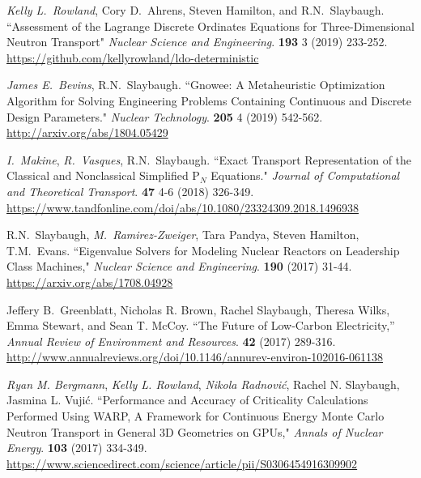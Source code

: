 \begin{bibsection}
\item \textit{Kelly L.\ Rowland}, Cory D.\ Ahrens, Steven Hamilton, and R.N.\ Slaybaugh. ``Assessment of the Lagrange Discrete Ordinates Equations for Three-Dimensional Neutron Transport"  \textit{Nuclear Science and Engineering}. \textbf{193} 3 (2019) 233-252.\\
\url{https://github.com/kellyrowland/ldo-deterministic}

\item \textit{James E.\ Bevins}, R.N.\ Slaybaugh. ``Gnowee: A Metaheuristic Optimization Algorithm for Solving Engineering Problems Containing Continuous and Discrete Design Parameters." \textit{Nuclear Technology}. \textbf{205} 4 (2019) 542-562.\\
\url{http://arxiv.org/abs/1804.05429}

\item \textit{I.\ Makine}, \textit{R.\ Vasques}, R.N.\ Slaybaugh. ``Exact Transport Representation of the Classical and Nonclassical Simplified P$_N$ Equations." \textit{Journal of Computational and Theoretical Transport}. \textbf{47} 4-6 (2018) 326-349.\\
\url{https://www.tandfonline.com/doi/abs/10.1080/23324309.2018.1496938}

\item R.N.\ Slaybaugh, \textit{M.\ Ramirez-Zweiger}, Tara Pandya, Steven Hamilton, T.M.\ Evans. ``Eigenvalue Solvers for Modeling Nuclear Reactors on Leadership Class Machines," \textit{Nuclear Science and Engineering}. \textbf{190} (2017) 31-44.\\
\url{https://arxiv.org/abs/1708.04928}

\item Jeffery B.\ Greenblatt, Nicholas R. Brown, Rachel Slaybaugh, Theresa Wilks, Emma Stewart, and Sean T. McCoy. ``The Future of Low-Carbon Electricity,'' \textit{Annual Review of Environment and Resources}. \textbf{42} (2017) 289-316. \\
\url{http://www.annualreviews.org/doi/10.1146/annurev-environ-102016-061138}

\item \textit{Ryan M. Bergmann}, \textit{Kelly L. Rowland}, \textit{Nikola Radnovi\'c}, Rachel N. Slaybaugh, Jasmina L. Vuji\'c. ``Performance and Accuracy of Criticality Calculations Performed Using WARP, A Framework for Continuous Energy Monte Carlo Neutron Transport in General 3D Geometries on GPUs," \textit{Annals of Nuclear Energy}. \textbf{103} (2017) 334-349.\\
\url{https://www.sciencedirect.com/science/article/pii/S0306454916309902}


\end{bibsection}
